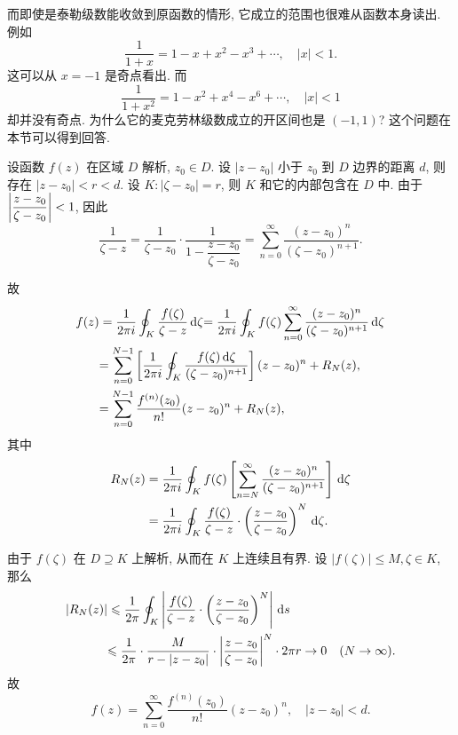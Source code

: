 而即使是泰勒级数能收敛到原函数的情形, 它成立的范围也很难从函数本身读出.
例如
\[\dfrac1{1+x}=1-x+x^2-x^3+\cdots,\quad|x|<1.\]
这可以从 $x=-1$ 是奇点看出.
而
\[\dfrac1{1+x^2}=1-x^2+x^4-x^6+\cdots,\quad|x|<1\]
却并没有奇点.
为什么它的麦克劳林级数成立的开区间也是 $(-1,1)$?
这个问题在本节可以得到回答.

设函数 $f(z)$ 在区域 $D$ 解析, $z_0\in D$.
设 $|z-z_0|$ 小于 $z_0$ 到 $D$ 边界的距离 $d$,
则存在 $|z-z_0|<r<d$.
设 $K:|\zeta-z_0|=r$, 则 $K$ 和它的内部包含在 $D$ 中.
由于 $\left|\dfrac{z-z_0}{\zeta-z_0}\right|<1$, 因此
\[\frac1{\zeta-z}=\frac1{\zeta-z_0}\cdot\frac1{1-\dfrac{z-z_0}{\zeta-z_0}}=\sum_{n=0}^\infty\frac{(z-z_0)^n}{(\zeta-z_0)^{n+1}}.\]


\begin{center}
\end{center}

故
\begin{align*}
	f(z)&=\frac1{2\pi i}\oint_K \frac{f(\zeta)}{\zeta-z}\,\mathrm{d}\zeta
	{=\frac1{2\pi i}\oint_K f(\zeta)\sum_{n=0}^\infty\frac{(z-z_0)^n}{(\zeta-z_0)^{n+1}}\,\mathrm{d}\zeta}\\
	&{=
	\sum_{n=0}^{N-1}\left[\frac1{2\pi i}\oint_K\frac{f(\zeta)\,\mathrm{d}\zeta}{(\zeta-z_0)^{n+1}}\right](z-z_0)^n+R_N(z),}\\
	&{=
	\sum_{n=0}^{N-1}\frac{f^{(n)}(z_0)}{n!}(z-z_0)^n+R_N(z),}
\end{align*}
其中
\begin{align*}
	R_N(z)&=\frac1{2\pi i}\oint_Kf(\zeta)\left[\sum_{n=N}^\infty\frac{(z-z_0)^n}{(\zeta-z_0)^{n+1}}\right]\,\mathrm{d}\zeta\\
	&=\frac1{2\pi i}\oint_K\frac{f(\zeta)}{\zeta-z}\cdot\left(\frac{z-z_0}{\zeta-z_0}\right)^N\,\mathrm{d}\zeta.
\end{align*}

由于 $f(\zeta)$ 在 $D\supseteq K$ 上解析, 从而在 $K$ 上连续且有界.
设 $|f(\zeta)|\le M,\zeta\in K$,
那么
\begin{align*}
	|R_N(z)|&\leqslant\frac 1{2\pi}\oint_K\left|\frac{f(\zeta)}{\zeta-z}\cdot\left(\frac{z-z_0}{\zeta-z_0}\right)^N\right|\,\mathrm{d} s\\
	&{\leqslant\frac 1{2\pi}\cdot \frac M{r-|z-z_0|}\cdot\left|\frac{z-z_0}{\zeta-z_0}\right|^N\cdot 2\pi r\to 0\quad (N\to\infty).}
\end{align*}
故
\[f(z)=\sum_{n=0}^\infty\frac{f^{(n)}(z_0)}{n!}(z-z_0)^n,\quad |z-z_0|<d.\]

